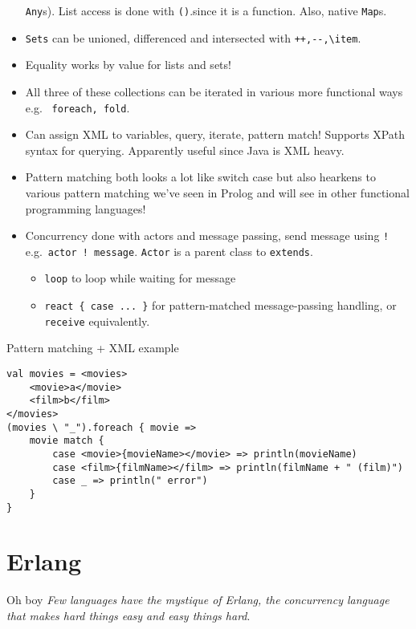 \documentclass[10pt]{article}
\begin{document}
\begin{itemize}
        \lstinline{Any}s). List access is done with \lstinline{()}.since it is a
        function. Also, native \lstinline{Map}s.
    \item \lstinline{Sets} can be unioned, differenced and intersected with
    \lstinline{++,--,\item}.
    \item Equality works by value for lists and sets!
    \item All three of these collections can be iterated in various more
        functional ways e.g. \ \lstinline{foreach, fold}.
    \item Can assign XML to variables, query, iterate, pattern match! Supports
        XPath syntax for querying. Apparently useful since Java is XML heavy.
    \item Pattern matching both looks a lot like switch case but also hearkens
        to various pattern matching we've seen in Prolog and will see in other
        functional programming languages!
    \item Concurrency done with actors and message passing, send message using
        \lstinline{!} e.g.\ \lstinline{actor ! message}. \lstinline{Actor} is a
        parent class to \lstinline{extends}.
        \begin{itemize}
            \item \lstinline{loop} to loop while waiting for message
            \item \lstinline$react { case ... }$ for pattern-matched
                message-passing handling, or \lstinline{receive} equivalently.
        \end{itemize}
\end{itemize}

Pattern matching + XML example
\begin{verbatim}
val movies = <movies>
    <movie>a</movie>
    <film>b</film>
</movies>
(movies \ "_").foreach { movie =>
    movie match {
        case <movie>{movieName></movie> => println(movieName)
        case <film>{filmName></film> => println(filmName + " (film)")
        case _ => println(" error")
    }
}
\end{verbatim}

\section{Erlang}

Oh boy \emph{Few languages have the mystique of Erlang, the concurrency language
that makes hard things easy and easy things hard}.
\end{document}
